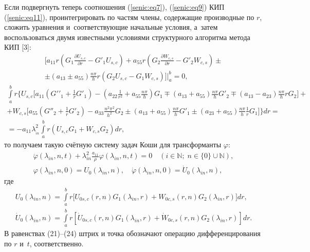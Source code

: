Если подвергнуть теперь соотношения (\ref{senic:eq7}), (\ref{senic:eq9}) КИП (\ref{senic:eq11}), проинтегрировать по 
частям члены, содержащие производные по $r$, сложить уравнения и~соответствующие начальные условия, а~затем воспользоваться двумя известными условиями структурного алгоритма метода КИП [3]:
\begin{multline}
\Bigg[ {a_{11} } r\left( {G_1 \frac{\partial U_{s,c} }{\partial r} - 
{G}'_1 U_{s,c} } \right) + a_{55} r\left( {G_2 \frac{\partial W_{c,s} 
}{\partial r} - {G}'_2 W_{c,s} } \right)\pm \\
\pm \left( {a_{13} \pm a_{55} } \right)\frac{n\pi }{h}r {\left( {G_2 
U_{s,c} - G_1 W_{c,s} } \right)} \Bigg]\Bigg|_a^b   = 0,
\end{multline}
\begin{multline}
\label{senic:eq13}
\int\limits_a^b r\Bigg\{ {U_{s,c} }  \Bigg[ {a_{11} } 
\left( {{{G}'}'_1 + \frac{1}{r}{G}'_1 } \right) - \left( {a_{22} 
\frac{1}{r^2} + a_{55} \frac{n\pi }{h}} \right)G_1 \mp \left( {a_{13} + 
a_{55} } \right)\frac{n\pi }{h}{G}'_2 
\mp \left( {a_{13} - a_{23} } \right)\frac{n\pi }{h}r{G_2 } \Bigg] 
+ \\
+ W_{c,s} \Bigg[ {a_{55} \left( {{G}''_2 + \frac{1}{r}{G}'_2 } \right)} 
 - a_{33} \frac{n^2\pi ^2}{h^2}G_2 \pm \left( {a_{13} + a_{55} } 
\right)\frac{n\pi }{h}{G}'_1 
\pm \left( {a_{23} + a_{55} } \right)\frac{n\pi }{h}\frac{1}{r}
 {G_1 } \Bigg] \Bigg\} dr =\\
 = - a_{11} \lambda _{_{in} }^2 
\int\limits_a^b r\left( {U_{s,c} G_1 + W_{c,s} G_2 } \right)dr, 
\end{multline}
то получаем такую счётную систему задач Коши для трансформанты $\varphi$:
\begin{gather}
\label{senic:eq14}
\ddot \varphi  \left( {\lambda _{in} ,n,t} 
\right) + \lambda _{in}^2 \frac{a_{11} }{\rho }\varphi \left( {\lambda _{in} 
,n,t} \right) = 0 \quad (i \in \mathbb N;\; n \in \{0\}\cup \mathbb N), \\
\varphi \left( {\lambda _{in}, n, 0} \right) = U_0 \left( {\lambda _{in}, n} \right), \quad  
\dot \varphi \left( {\lambda _{in} , n, 0} \right)= \dot U_0 \left( \lambda _{in}, n \right),
\end{gather}
где
\begin{equation}
\label{senic:eq15}
\begin{array}{c}
\displaystyle
U_0 \left( {\lambda _{in}, n} \right) = \int\limits_a^b r\Big[ {U_{0s,c} 
\left( {r,n} \right)G_1 \left( {\lambda _{in} ,r} \right) + W_{0c,s} \left( 
r, n \right)G_2 \left( {\lambda _{in}, r} \right)} \Big]dr,\\
\displaystyle 
\dot U_0 \left( {\lambda _{in}, n} \right) = \int\limits_a^b r\left[ {\dot U_{0s,c} \left( r, n \right)G_1 \left( \lambda _{in}, r \right) + \dot W_{0c,s} \left( {r,n} \right)G_2 \left( \lambda _{in}, r \right)} \right] dr.
\end{array}
\end{equation}
В равенствах (21)--(24) штрих и точка обозначают операцию дифференцирования 
по $r$ и~$t$, соответственно.

